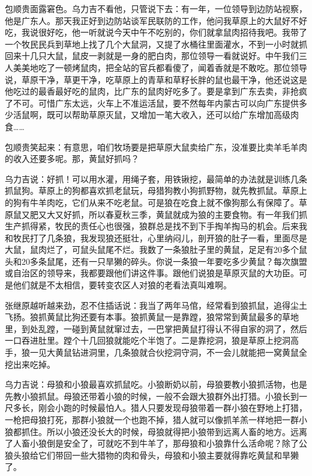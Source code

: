 \par 包顺贵面露窘色。乌力吉不看他，只管说下去：有一年，一位领导到边防站视察，他是广东人。那天我正好到边防站谈军民联防的工作，他问我草原上的大鼠好不好吃，我说很好吃，他一听就说今天中午不吃别的，你们就拿鼠肉招待我吧。我带了一个牧民民兵到草地上找了几个大鼠洞，又提了水桶往里面灌水，不到一小时就抓回来十几只大鼠，鼠皮一剥就是一身的肥白肉，那位领导一看就说好。中午我们三人美美地吃了一顿烤鼠肉，把全站的官兵都看傻了，闻着香就是不敢吃。那位领导说，草原干净，草更干净，吃草原上的青草和草籽长胖的鼠也最干净，他还说这是他吃过的最香最好吃的鼠肉，比广东的鼠肉好吃多了。要是拿到广东去卖，非抢疯了不可。可惜广东太远，火车上不准运活鼠，要不然每年内蒙古可以向广东提供多少活鼠啊，既可以帮助草原灭鼠，又增加一笔大收入，还可以给广东增加高级肉食……
\par 包顺贵笑起来：有意思，咱们牧场要是把草原大鼠卖给广东，没准要比卖羊毛羊肉的收入还要多呢。那，黄鼠好抓吗？
\par 乌力吉说：好抓！可以用水灌，用绳子套，用铁锹挖，最简单的办法就是训练几条抓鼠狗。草原上的狗都喜欢抓老鼠玩，母猎狗教小狗抓野物，就先教抓鼠。草原上的狗有牛羊肉吃，它们从来不吃老鼠。可是狼在吃食上就不像狗那么有保障了。草原鼠又肥又大又好抓，所以春夏秋三季，黄鼠就成为狼的主要食物。有一年我们抓生产抓得紧，牧民的责任心也很强，狼群总是找不到下手掏羊掏马的机会。后来我和牧民打了几条狼，我发现狼还挺壮，心里纳闷儿，剖开狼的肚子一看，里面尽是大鼠，鼠肉烂了，可鼠头鼠尾不烂。我数了一条狼肚子里的黄鼠，足足有20多个鼠头和20多条鼠尾，还有一只旱獭的碎头。你说一条狼一年要吃多少黄鼠？每次旗盟或自治区的领导来，我都要跟他们讲这件事。跟他们说狼是草原灭鼠的大功臣。可是他们就是不太相信，要转变农区人对狼的老看法真叫难啊。
\par 张继原越听越来劲，忍不住插话说：我当了两年马倌，经常看到狼抓鼠，追得尘土飞扬。狼抓黄鼠比狗还要有本事。狼抓黄鼠一是靠蹚，狼常常到黄鼠最多的草地里，到处乱蹚，一碰到黄鼠就窜过去，一巴掌把黄鼠打得认不得自家的洞了，然后一口吞进肚里。蹚个十几回狼就能吃个半饱了。二是靠挖洞，狼是草原上挖洞高手，狼一见大黄鼠钻进洞里，几条狼就合伙挖洞守洞，不一会儿就能把一窝黄鼠全挖出来吃掉。
\par 乌力吉说：母狼和小狼最喜欢抓鼠吃。小狼断奶以前，母狼要教小狼抓活物，也是先教小狼抓鼠。母狼还带着小狼的时候，一般不会跟大狼群外出打猎。小狼长到一尺多长，刚会小跑的时候最怕人。猎人只要发现母狼带着一群小狼在野地上打猎，一枪把母狼打死，那群小狼就一个也跑不掉，猎人就可以像抓羊羔一样地把一群小狼都抓住。所以小狼还没长大的时候，母狼就得把小狼带到远离人畜的地方。远离了人畜小狼倒是安全了，可就吃不到牛羊了，那母狼和小狼靠什么活命呢？除了公狼头狼给它们带回一些大猎物的肉和骨头，母狼和小狼主要就得靠吃黄鼠和旱獭了。
